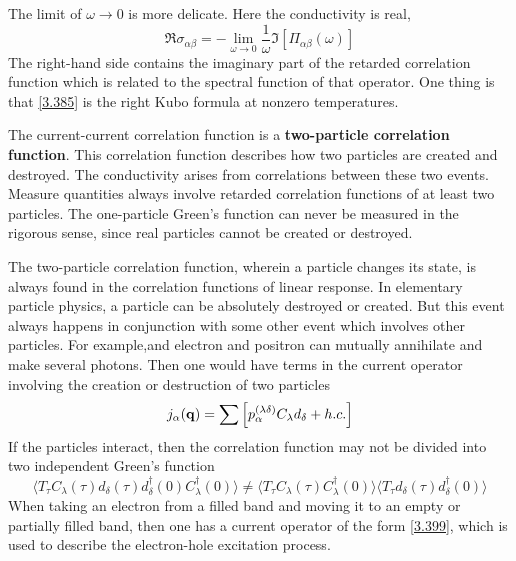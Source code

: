 The limit of $\omega \to 0$ is more delicate.
Here the conductivity is real,
\begin{equation}
    \Re \sigma_{\alpha\beta} = - \lim_{\omega\to 0} \frac{1}{\omega} \Im \left[\Pi_{\alpha\beta}(\omega) \right]    \label{3.393}
\end{equation}
The right-hand side contains the imaginary part of the retarded correlation function which is related to the spectral function of that operator.
One thing is that \eqref{3.385} is the right Kubo formula at nonzero temperatures.

The current-current correlation function is a \textbf{two-particle correlation function}.
This correlation function describes how two particles are created and destroyed.
The conductivity arises from correlations between these two events.
Measure quantities always involve retarded correlation functions of at least two particles.
The one-particle Green's function can never be measured in the rigorous sense, since real particles cannot be created or destroyed.

The two-particle correlation function, wherein a particle changes its state, is always found in the correlation functions of linear response.
In elementary particle physics, a particle can be absolutely destroyed or created.
But this event always happens in conjunction with some other event which involves other particles.
For example,and electron and positron can mutually annihilate and make several photons.
Then one would have terms in the current operator involving the creation or destruction of two particles
\begin{equation}
    j_\alpha(\mathbf{q}) = \sum \left[ p_\alpha^{(\lambda\delta)} C_\lambda d_\delta + h.c. \right]    \label{3.399}
\end{equation}
If the particles interact, then the correlation function may not be divided into two independent Green's function
\begin{equation}
    \langle T_\tau C_\lambda(\tau) d_\delta(\tau) d^\dagger_\delta(0) C^\dagger_\lambda(0)\rangle \neq \langle T_\tau C_\lambda(\tau) C^\dagger_\lambda(0) \rangle \langle T_\tau d_\delta(\tau) d^\dagger_\delta(0) \rangle    \label{3.400}
\end{equation}
When taking an electron from a filled band and moving it to an empty or partially filled band, then one has a current operator of the form \eqref{3.399}, which is used to describe the electron-hole excitation process.

